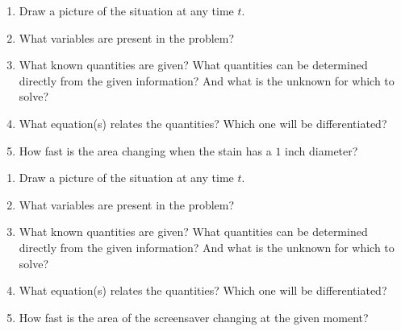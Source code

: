 \begin{enumerate}[label=\hspace{11pt}(\alph*), align=left, leftmargin=*, labelsep=0.25em]
    \item Draw a picture of the situation at any time $t$.
    \item What variables are present in the problem?
    \item What known quantities are given? What quantities can be determined directly from the given information? And what is the unknown for which to solve?
    \item What equation(s) relates the quantities? Which one will be differentiated?
    \item How fast is the area changing when the stain has a $1$ inch diameter?
\end{enumerate} \vspace{11pt}

\begin{enumerate}[label=\hspace{11pt}(\alph*), align=left, leftmargin=*, labelsep=0.25em]
    \item Draw a picture of the situation at any time $t$.
    \item What variables are present in the problem?
    \item What known quantities are given? What quantities can be determined directly from the given information? And what is the unknown for which to solve?
    \item What equation(s) relates the quantities? Which one will be differentiated?
    \item How fast is the area of the screensaver changing at the given moment?
\end{enumerate} \vspace{11pt}

